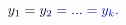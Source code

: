 \documentclass[12pt]{article}
\begin{document}
\makeatletter
\renewcommand*{\@textcolor}[3]{%
  \protect\leavevmode
  \begingroup
    \color#1{#2}#3%
  \endgroup
}
\makeatother
\begin{displaymath}
\mathcolor[RGB]{0,0,15}{y} _ { \mathcolor[RGB]{0,0,30}{1} } \mathcolor[RGB]{0,0,45}{=} \mathcolor[RGB]{0,0,60}{y} _ { \mathcolor[RGB]{0,0,75}{2} } \mathcolor[RGB]{0,0,90}{=} \mathcolor[RGB]{0,0,105}{.} \mathcolor[RGB]{0,0,120}{.} \mathcolor[RGB]{0,0,135}{.} \mathcolor[RGB]{0,0,150}{=} \mathcolor[RGB]{0,0,165}{y} _ { \mathcolor[RGB]{0,0,180}{k} } \mathcolor[RGB]{0,0,195}{.}
\end{displaymath}
\end{document}
